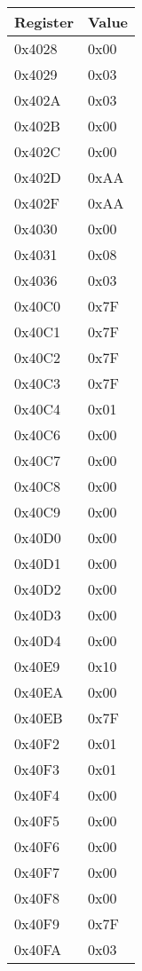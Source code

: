 \begin{tabular}{ll}
	Register & Value \\
	\hline
	\hline
	0x4028 & 0x00 \\
	0x4029 & 0x03 \\
	0x402A & 0x03 \\
	0x402B & 0x00 \\
	0x402C & 0x00 \\
	0x402D & 0xAA \\
	0x402F & 0xAA \\
	0x4030 & 0x00 \\
	0x4031 & 0x08 \\
	0x4036 & 0x03 \\
	0x40C0 & 0x7F \\
	0x40C1 & 0x7F \\
	0x40C2 & 0x7F \\
	0x40C3 & 0x7F \\
	0x40C4 & 0x01 \\
	0x40C6 & 0x00 \\
	0x40C7 & 0x00 \\
	0x40C8 & 0x00 \\
	0x40C9 & 0x00 \\
	0x40D0 & 0x00 \\
	0x40D1 & 0x00 \\
	0x40D2 & 0x00 \\
	0x40D3 & 0x00 \\
	0x40D4 & 0x00 \\
	0x40E9 & 0x10 \\
	0x40EA & 0x00 \\
	0x40EB & 0x7F \\
	0x40F2 & 0x01 \\
	0x40F3 & 0x01 \\
	0x40F4 & 0x00 \\
	0x40F5 & 0x00 \\
	0x40F6 & 0x00 \\
	0x40F7 & 0x00 \\
	0x40F8 & 0x00 \\
	0x40F9 & 0x7F \\
	0x40FA & 0x03 \\
	\hline
\end{tabular}